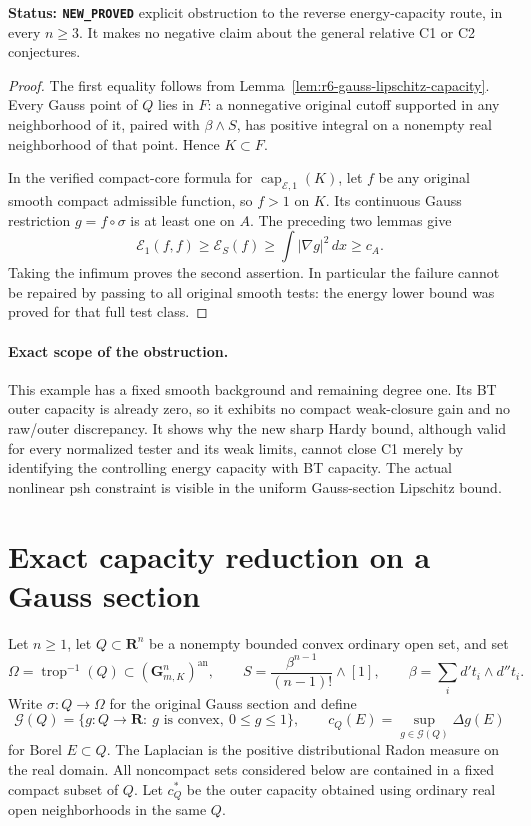\documentclass[11pt,a4paper]{article}
\numberwithin{equation}{section}
\theoremstyle{definition}
\theoremstyle{remark}
\newcommand{\an}{\mathrm{an}}
\begin{document}
\noindent\textbf{Status: \texttt{NEW\_PROVED}} explicit obstruction
to the reverse energy-capacity route, in every $n\ge3$. It makes no
negative claim about the general relative C1 or C2 conjectures.

\begin{proof}
The first equality follows from
Lemma~\ref{lem:r6-gauss-lipschitz-capacity}. Every Gauss point of
$Q$ lies in $F$: a nonnegative original cutoff supported in any
neighborhood of it, paired with $\beta\wedge S$, has positive
integral on a nonempty real neighborhood of that point. Hence
$K\subset F$.

In the verified compact-core formula for
$\operatorname{cap}_{\mathcal E,1}(K)$, let $f$ be any original
smooth compact admissible function, so $f>1$ on $K$. Its continuous
Gauss restriction $g=f\circ\sigma$ is at least one on $A$.
The preceding two lemmas give
\[
           \mathcal E_1(f,f)\ge\mathcal E_S(f)
                    \ge\int|\nabla g|^2\,dx\ge c_A.
\]
Taking the infimum proves the second assertion. In particular the
failure cannot be repaired by passing to all original smooth tests:
the energy lower bound was proved for that full test class.
\end{proof}

\paragraph{Exact scope of the obstruction.}
This example has a fixed smooth background and remaining degree one.
Its BT outer capacity is already zero, so it exhibits no compact
weak-closure gain and no raw/outer discrepancy. It shows why the
new sharp Hardy bound, although valid for every normalized tester and
its weak limits, cannot close C1 merely by identifying the controlling
energy capacity with BT capacity. The actual nonlinear psh constraint
is visible in the uniform Gauss-section Lipschitz bound.



\section{Exact capacity reduction on a Gauss section}
\label{sec:r6-gauss-convex-capacity}

Let $n\ge1$, let $Q\subset\mathbf R^n$ be a nonempty bounded convex
ordinary open set, and set
\[
 \Omega=\operatorname{trop}^{-1}(Q)\subset(\mathbf G_{m,K}^n)^{\an},
 \qquad S=\frac{\beta^{n-1}}{(n-1)!}\wedge[1],
 \qquad \beta=\sum_i d't_i\wedge d''t_i.
\]
Write $\sigma:Q\to\Omega$ for the original Gauss section and define
\[
 \mathcal G(Q)=\{g:Q\to\mathbf R:\ g\text{ is convex},\ 0\le g\le1\},
 \qquad c_Q(E)=\sup_{g\in\mathcal G(Q)}\Delta g(E)
\]
for Borel $E\subset Q$. The Laplacian is the positive distributional
Radon measure on the real domain. All noncompact sets considered below
are contained in a fixed compact subset of $Q$. Let $c_Q^*$ be the
outer capacity obtained using ordinary real open neighborhoods in the
same $Q$.
\end{document}

